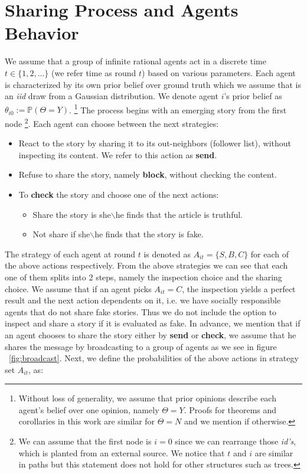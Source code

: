 \section{Sharing Process and Agents Behavior}
\label{sec:SharingProc}

We assume that a group of infinite rational agents act in a discrete time $t \in \{1,2,...\}$ (we refer time as round $t$) based on various parameters. Each agent is characterized by its own prior belief over ground truth which we assume that is an \textit{iid} draw from a Gaussian distribution. We denote agent $i$'s prior belief as $\theta_{i0} := \mathbb{P} ( \Theta = Y ) $. \footnote{Without loss of generality, we assume that prior opinions describe each agent's belief over one opinion, namely $\Theta = Y$. Proofs for theorems and corollaries in this work are similar for $\Theta = N$ and we mention if otherwise.} The process begins with an emerging story from the first node \footnote{We can assume that the first node is $i=0$ since we can rearrange those \textit{id's}, which is planted from an external source. We notice that $t$ and $i$ are similar in paths but this statement does not hold for other structures such as trees.}. Each agent can choose between the next strategies:

\begin{itemize}
	\item React to the story by sharing it to its out-neighbors (follower list), without inspecting its content. We refer to this action as \textbf{send}.
	\item Refuse to share the story, namely \textbf{block}, without checking the content.
	\item To \textbf{check} the story and choose one of the next actions:
	\begin{itemize}
		\item Share the story is she$\backslash$he finds that the article is truthful.
		\item Not share if she$\backslash$he finds that the story is fake.
	\end{itemize}
\end{itemize}

The strategy of each agent at round $t$ is denoted as $A_{it} = \{S,B,C\}$ for each of the above actions respectively. From the above strategies we can see that each one of them splits into 2 steps, namely the inspection choice and the sharing choice. We assume that if an agent picks $A_{it} = C$, the inspection yields a perfect result and the next action dependents on it, i.e. we have socially responsible agents that do not share fake stories. Thus we do not include the option to inspect and share a story if it is evaluated as fake. In advance, we mention that if an agent chooses to share the story either by \textbf{send} or \textbf{check}, we assume that he shares the message by broadcasting to a group of agents as we see in figure ~\ref{fig:broadcast}. Next, we define the probabilities of the above actions in strategy set $A_{it}$, as:

